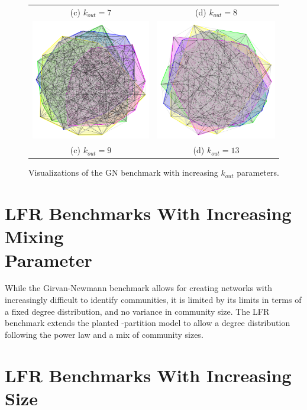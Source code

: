 \begin{figure}
\begin{tabular}{cc}
		(c) $k_{out}=7$ & (d) $k_{out}=8$ \\[6pt]
		\includegraphics[width=65mm]{images/girvan_kout_9_0.png} &   \includegraphics[width=65mm]{images/girvan_kout_13_0.png} \\
		(c) $k_{out}=9$ & (d) $k_{out}=13$ \\[6pt]
		
	\end{tabular}
	\caption{Visualizations of the GN benchmark with increasing $k_{out}$ parameters.}
\end{figure}



\section{LFR Benchmarks With Increasing Mixing \\ Parameter}
While the Girvan-Newmann benchmark allows for creating networks with increasingly difficult to identify communities, it is limited by its limits in terms of a fixed degree distribution, and no variance in community size. The LFR benchmark extends the planted \ell-partition model to allow a degree distribution following the power law and a mix of community sizes.










\section{LFR Benchmarks With Increasing Size}



